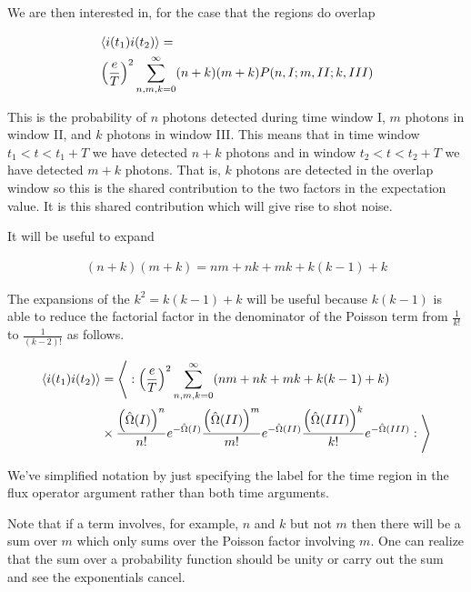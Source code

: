 \documentclass[12pt]{article}
\begin{document}
We are then interested in, for the case that the regions do overlap

\begin{align}
\label{twotime}
&\Braket{i(t_1)i(t_2)} =\\
&\left(\frac{e}{T}\right)^2 \sum_{n,m,k=0}^{\infty} (n+k)(m+k)P(n,I;m,II;k,III)
\end{align}

This is the probability of $n$ photons detected during time window I, $m$ photons in window II, and $k$ photons in window III. This means that in time window $t_1<t<t_1+T$ we have detected $n+k$ photons and in window $t_2<t<t_2+T$ we have detected $m+k$ photons. That is, $k$ photons are detected in the overlap window so this is the shared contribution to the two factors in the expectation value. It is this shared contribution which will give rise to shot noise.

It will be useful to expand

\begin{align}
(n+k)(m+k) = nm + nk + mk + k(k-1) + k
\end{align}

The expansions of the $k^2 = k(k-1) + k$ will be useful because $k(k-1)$ is able to reduce the factorial factor in the denominator of the Poisson term from $\frac{1}{k!}$ to $\frac{1}{(k-2)!}$ as follows.

\begin{align}
\Braket{i(t_1)i(t_2)} &= \Bigg \langle: \left(\frac{e}{T}\right)^2 \sum_{n,m,k=0}^{\infty} (nm + nk + mk + k(k-1) + k)\\
&\times \frac{\left(\hat{\Omega}(I)\right)^n}{n!}e^{-\hat{\Omega}(I)} \frac{\left(\hat{\Omega}(II)\right)^m}{m!}e^{-\hat{\Omega}(II)} \frac{\left(\hat{\Omega}(III)\right)^k}{k!}e^{-\hat{\Omega}(III)} :\Bigg \rangle\\
\end{align}

We've simplified notation by just specifying the label for the time region in the flux operator argument rather than both time arguments.

Note that if a term involves, for example, $n$ and $k$ but not $m$ then there will be a sum over $m$ which only sums over the Poisson factor involving $m$. One can realize that the sum over a probability function should be unity or carry out the sum and see the exponentials cancel.
\end{document}
